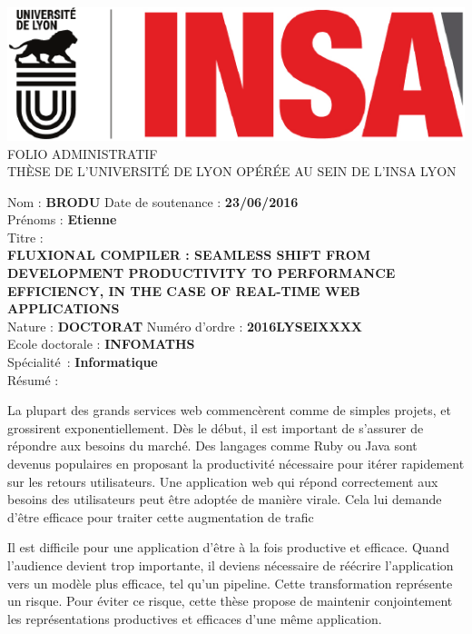 \begin{center}
  \includegraphics[height=.6in]{../resources/logos}%
  \\[3pt]%
  \fontsize{14pt}{14pt}\selectfont%
  \MakeUppercase{FOLIO ADMINISTRATIF}\\[3pt]%
  \MakeUppercase{Thèse de l'Université de Lyon opérée au sein de l'Insa Lyon}
\end{center}

\begin{framed}
\noindent %
Nom : \textbf{\MakeUppercase{Brodu}} \hfill Date de soutenance : \textbf{23/06/2016}\\[3pt]
Prénoms : \textbf{Etienne}\\[3pt]
Titre :\\
\textbf{\MakeUppercase{Fluxional compiler : seamless shift from development productivity to performance efficiency, in the case of real-time web applications}}
\\

\noindent %
Nature : \textbf{\MakeUppercase{Doctorat}} \hfill Numéro d'ordre :  \textbf{2016LYSEIXXXX}\\[3pt]
Ecole doctorale : \textbf{INFOMATHS}\\[3pt]
Spécialité : \textbf{Informatique}\\[3pt]
Résumé : \\
{\fontsize{11pt}{12pt}\selectfont%
La plupart des grands services web commencèrent comme de simples projets, et grossirent exponentiellement.
Dès le début, il est important de s'assurer de répondre aux besoins du marché.
Des langages comme Ruby ou Java sont devenus populaires en proposant la productivité  nécessaire pour itérer rapidement sur les retours utilisateurs.
Une application web qui répond correctement aux besoins des utilisateurs peut être adoptée de manière virale.
Cela lui demande d'être efficace pour traiter cette augmentation de trafic

Il est difficile pour une application d'être à la fois productive et efficace.
Quand l'audience devient trop importante, il deviens nécessaire de réécrire l'application vers un modèle plus efficace, tel qu'un pipeline.
Cette transformation représente un risque.
Pour éviter ce risque, cette thèse propose de maintenir conjointement les représentations productives et efficaces d'une même application.

}
\end{framed}
